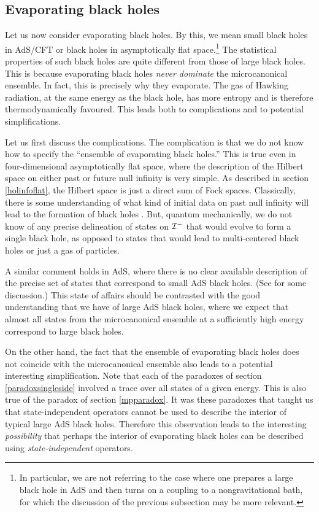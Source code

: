 \documentclass[12pt]{article}
\def \scrim{{\cal I}^{-}}
\begin{document}
\subsection{Evaporating black holes \label{structureevap}}
Let us now consider evaporating black holes. By this, we mean small black holes in AdS/CFT or black holes in asymptotically flat space.\footnote{In particular, we are not referring to the case where one prepares a large black hole in AdS and then turns on a coupling to a nongravitational bath, for which the discussion of the previous subsection may be more relevant.} The statistical properties of such black holes are quite different from those of large black holes. This is because evaporating black holes {\em never dominate} the microcanonical ensemble. In fact, this is precisely why they evaporate. The gas of Hawking radiation, at the same energy as the black hole, has more entropy and is therefore thermodynamically favoured. This leads both to complications and to potential simplifications.
 
Let us first discuss the complications. The complication is that we do not know how to specify the ``ensemble of evaporating black holes.'' This is true even in four-dimensional asymptotically flat space, where the description of the Hilbert space on either past or future null infinity is very simple. As described in section \ref{holinfoflat}, the Hilbert space is just a direct sum of Fock spaces. Classically, there is some understanding of what kind of initial data on past null infinity will lead to the formation of black holes \cite{Gundlach:2007gc}. But, quantum mechanically, we do not know of any precise delineation of states on $\scrim$ that would evolve to form a single black hole, as opposed to states that would lead to multi-centered black holes or just a gas of particles. 

A similar comment holds in AdS, where there is no clear available description of the precise set of states that correspond to small AdS black holes. (See  \cite{Hanada:2016pwv} for some discussion.) This state of affairs should be contrasted with the good understanding that we have of large AdS black holes, where we expect that almost all states from the microcanonical ensemble at a sufficiently high energy correspond to large black holes.  
  


On the other hand, the fact that the ensemble of evaporating black holes does not coincide with the microcanonical ensemble also leads to a potential interesting simplification. Note that each of the paradoxes of section \ref{paradoxsingleside} involved a trace over all states of a given energy. This is also true of the paradox of section \ref{mpparadox}. It was these paradoxes that taught us that state-independent operators cannot be used to describe the interior of typical large AdS black holes. Therefore this observation leads to the interesting {\em possibility} that perhaps the interior of evaporating black holes can be described using {\em state-independent} operators.
\end{document}
